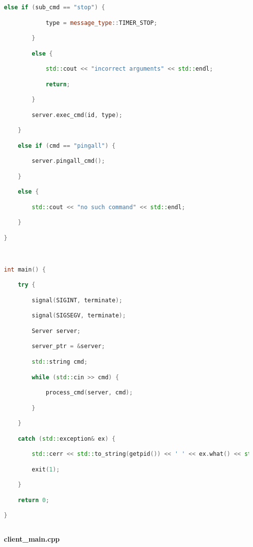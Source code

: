 \begin{lstlisting}[language=C++]
        else if (sub_cmd == "stop") {

            type = message_type::TIMER_STOP;

        } 

        else {

            std::cout << "incorrect arguments" << std::endl;

            return;

        }

        server.exec_cmd(id, type);

    } 

    else if (cmd == "pingall") {

        server.pingall_cmd();

    } 

    else {

        std::cout << "no such command" << std::endl;

    }

}



int main() {

    try {

        signal(SIGINT, terminate);

        signal(SIGSEGV, terminate);

        Server server;

        server_ptr = &server;

        std::string cmd;

        while (std::cin >> cmd) {

            process_cmd(server, cmd);

        }

    } 

    catch (std::exception& ex) {

        std::cerr << std::to_string(getpid()) << ' ' << ex.what() << std::endl;

        exit(1);

    }

    return 0;

}



\end{lstlisting}

\textbf{client\_main.cpp}

